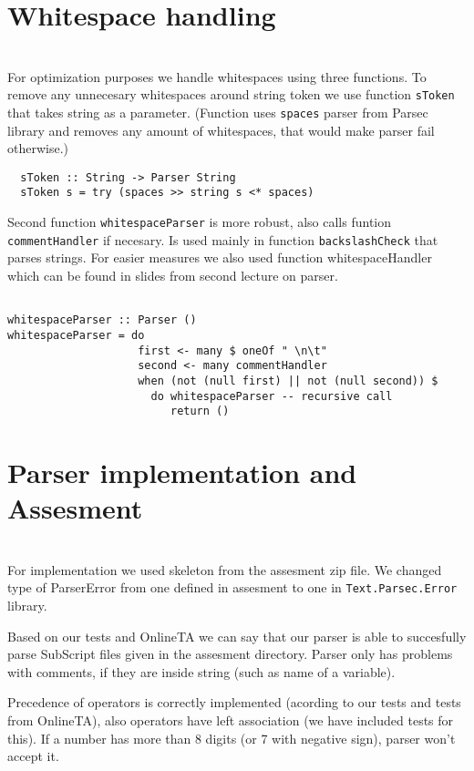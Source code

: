 \documentclass[11pt]{article}
\begin{document}
\section{Whitespace handling} \\

For optimization purposes we handle whitespaces using three functions. To remove any unnecesary whitespaces around string
 token we use function \texttt{sToken} that takes string as a parameter. (Function uses \texttt{spaces} parser from Parsec library and removes any amount of whitespaces, that would make parser fail otherwise.)
\begin{verbatim}
  sToken :: String -> Parser String
  sToken s = try (spaces >> string s <* spaces)
\end{verbatim}
Second function \texttt{whitespaceParser} is more robust, also calls funtion \texttt{commentHandler} if necesary. Is used mainly in function
\texttt{backslashCheck} that parses strings. For easier measures we also used function whitespaceHandler which can be found in slides from second lecture on parser.
\begin{verbatim}

whitespaceParser :: Parser ()
whitespaceParser = do
                    first <- many $ oneOf " \n\t"
                    second <- many commentHandler
                    when (not (null first) || not (null second)) $
                      do whitespaceParser -- recursive call
                         return ()
\end{verbatim}





\section{Parser implementation and Assesment} \\

For implementation we used skeleton from the assesment zip file. We changed type of ParserError from one defined in assesment to one in \texttt{Text.Parsec.Error} library. 

Based on our tests and OnlineTA we can say that our parser is able to succesfully parse SubScript files given in the assesment directory. 
Parser only has problems with comments, if they are inside string (such as name of a variable).

 Precedence of operators is correctly implemented (acording to our tests and tests from OnlineTA), also operators have left association
 (we have included tests for this). If a number has more than 8 digits (or 7 with negative sign), parser won't accept it.
\end{document}
